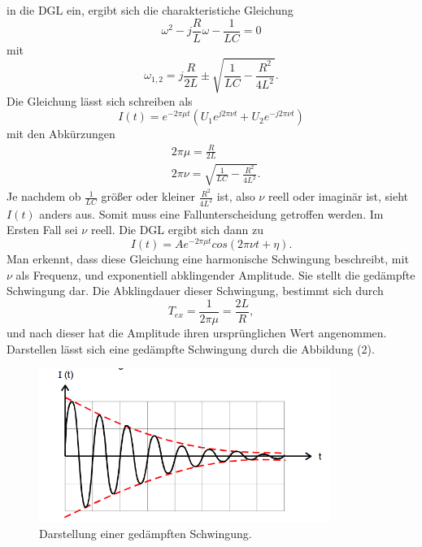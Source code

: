 in die DGL ein, ergibt sich die charakteristiche Gleichung
\begin{equation}
\omega^{2} - j\frac{R}{L}\omega - \frac{1}{LC} = 0 
\end{equation}
\noindent mit 
\begin{equation}
\omega_{1,2} = j \frac{R}{2L} \pm \sqrt{\frac{1}{LC} - \frac{R^{2}}{4L^{2}}} .
\end{equation}
\noindent Die Gleichung lässt sich schreiben als 
\begin{equation}
I(t) = e^{-2\pi \mu t}(U_1 e^{j2\pi \nu t} + U_2 e^{-j2\pi \nu t})
\end{equation}
\noindent mit den Abkürzungen 
\begin{align}
&2\pi \mu = \frac{R}{2L} \\
&2\pi \nu = \sqrt{\frac{1}{LC} - \frac{R^{2}}{4L^{2}}} .
\end{align}
\noindent Je nachdem ob $\frac{1}{LC}$ größer oder kleiner $\frac{R^2}{4L^2}$ ist, also $\nu$ reell oder imaginär ist,
sieht $I(t)$ anders aus. Somit muss eine Fallunterscheidung getroffen werden.
Im Ersten Fall sei $\nu$ reell. Die DGL ergibt sich dann zu
\begin{equation}
I(t) = Ae^{-2\pi \mu t}cos(2\pi \nu t + \eta) .
\end{equation}
Man erkennt, dass diese Gleichung eine harmonische Schwingung beschreibt, mit $\nu$ als Frequenz, und exponentiell abklingender Amplitude.
Sie stellt die gedämpfte Schwingung dar. Die Abklingdauer dieser Schwingung, bestimmt sich durch
\begin{equation}
T_{ex} = \frac{1}{2\pi \mu} = \frac{2L}{R} ,
\end{equation}
und nach dieser hat die Amplitude ihren ursprünglichen Wert angenommen.
Darstellen lässt sich eine gedämpfte Schwingung durch die Abbildung (2).
\begin{figure}[H]
  \centering
  \includegraphics[height=5cm]{grenzfall.png}
  \caption{Darstellung einer gedämpften Schwingung. \cite[S.4]{kent}}
\end{figure}
